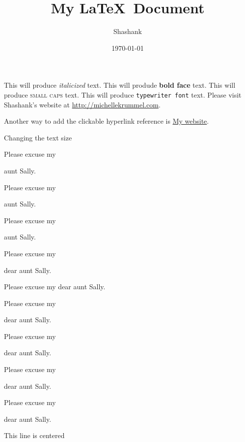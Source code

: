 \documentclass[11pt]{article}
\title{My \LaTeX\ Document}
\author{Shashank}
\date{\today}
\begin{document}
\tableofcontents

\maketitle


This will produce \textit{italicized} text.
This will produde \textbf{bold face} text.
This will produce \textsc{small caps} text.
This will produce \texttt{typewriter font} text.
Please visit Shashank's website at \url{http://michellekrummel.com}.

Another way to add the clickable hyperlink reference is \href{http://michellekrummel.com}{My website}.

\vspace{1cm}
Changing the text size

Please excuse my \begin{tiny}aunt Sally. \end{tiny}

Please excuse my \begin{scriptsize}aunt Sally. \end{scriptsize}

Please excuse my \begin{small}aunt Sally. \end{small}

Please excuse my \begin{normalsize}dear aunt Sally. \end{normalsize} 

Please excuse my dear aunt Sally.

Please excuse my \begin{large}dear aunt Sally.
\end{large} 

Please excuse my \begin{Large}dear aunt Sally.
\end{Large} 

Please excuse my \begin{huge}dear aunt Sally.
\end{huge} 

Please excuse my \begin{Huge}dear aunt Sally.
\end{Huge} 


\vspace{1cm}
\begin{center}This line is centered\end{center}
\end{document}
